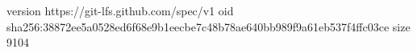 version https://git-lfs.github.com/spec/v1
oid sha256:38872ee5a0528ed6f68e9b1eecbe7c48b78ae640bb989f9a61eb537f4ffc03ce
size 9104
